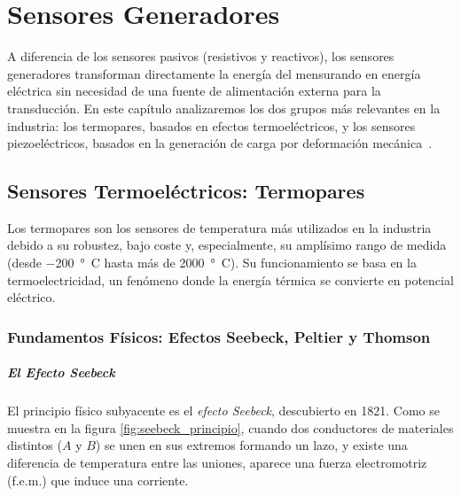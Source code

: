 
\chapter{Sensores Generadores}\label{cap:generadores}

A diferencia de los sensores pasivos (resistivos y reactivos), los sensores generadores transforman directamente la energía del mensurando en energía eléctrica sin necesidad de una fuente de alimentación externa para la transducción. En este capítulo analizaremos los dos grupos más relevantes en la industria: los termopares, basados en efectos termoeléctricos, y los sensores piezoeléctricos, basados en la generación de carga por deformación mecánica~\cite{pallasareny2000sensors}.


\section{Sensores Termoeléctricos: Termopares}\label{sec:termopares}
Los termopares son los sensores de temperatura más utilizados en la industria debido a su robustez, bajo coste y, especialmente, su amplísimo rango de medida (desde \qty{-200}{\degree C} hasta más de \qty{2000}{\degree C}). Su funcionamiento se basa en la termoelectricidad, un fenómeno donde la energía térmica se convierte en potencial eléctrico. 

\subsection{Fundamentos Físicos: Efectos Seebeck, Peltier y Thomson}
\paragraph{El Efecto Seebeck}
El principio físico subyacente es el \emph{efecto Seebeck}, descubierto en 1821. Como se muestra en la figura \ref{fig:seebeck_principio}, cuando dos conductores de materiales distintos ($A$ y $B$) se unen en sus extremos formando un lazo, y existe una diferencia de temperatura entre las uniones, aparece una fuerza electromotriz (f.e.m.) que induce una corriente.

